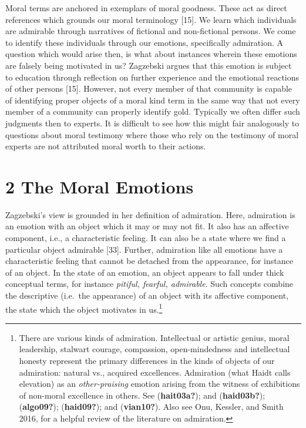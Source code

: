 \documentclass[12pt]{book}
\theoremstyle{definition}
\theoremstyle{remark}
\begin{document}
Moral terms are anchored in exemplars of moral goodness. These act as direct references which grounds our moral terminology {[}15{]}. We learn which individuals are admirable through narratives of fictional and non-fictional persons. We come to identify these individuals through our emotions, specifically admiration. A question which would arise then, is what about instances wherein these emotions are falsely being motivated in us? Zagzebski argues that this emotion is subject to education through reflection on further experience and the emotional reactions of other persons {[}15{]}. However, not every member of that community is capable of identifying proper objects of a moral kind term in the same way that not every member of a community can properly identify gold. Typically we often differ such judgments then to experts. It is difficult to see how this might fair analogously to questions about moral testimony where those who rely on the testimony of moral experts are not attributed moral worth to their actions.

\section{2 The Moral Emotions}\label{the-moral-emotions}

Zagzebski's view is grounded in her definition of admiration. Here, admiration is an emotion with an object which it may or may not fit. It also has an affective component, i.e., a characteristic feeling. It can also be a state where we find a particular object admirable {[}33{]}. Further, admiration like all emotions have a characteristic feeling that cannot be detached from the appearance, for instance of an object. In the state of an emotion, an object appears to fall under thick conceptual terms, for instance \emph{pitiful, fearful, admirable}. Such concepts combine the descriptive (i.e.~the appearance) of an object with its affective component, the state which the object motivates in us.\footnote{There are various kinds of admiration. Intellectual or artistic genius, moral leadership, stalwart courage, compassion, open-mindedness and intellectual honesty represent the primary differences in the kinds of objects of our admiration: natural vs., acquired excellences. Admiration (what Haidt calls elevation) as an \emph{other-praising} emotion arising from the witness of exhibitions of non-moral excellence in others. See (\textbf{hait03a?}); and (\textbf{haid03b?}); (\textbf{algo09?}); (\textbf{haid09?}); and (\textbf{vian10?}). Also see Onu, Kessler, and Smith 2016, for a helpful review of the literature on admiration.}
\end{document}
